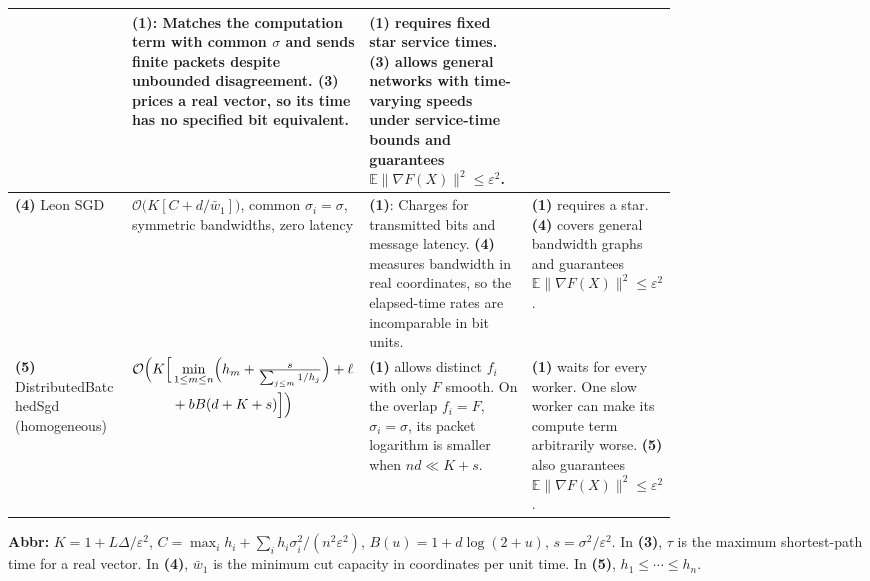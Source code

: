 \begin{table}[tp]
\begin{threeparttable}
\begin{tabularx}{\linewidth}{@{}>{\raggedright\arraybackslash}p{0.20\linewidth}>{\raggedright\arraybackslash}p{0.32\linewidth}>{\raggedright\arraybackslash}p{0.25\linewidth}>{\raggedright\arraybackslash}X@{}}
& \textbf{(1)}: Matches the computation term with common $\sigma$ and sends finite packets despite unbounded disagreement. \textbf{(3)} prices a real vector, so its time has no specified bit equivalent.
& \textbf{(1)} requires fixed star service times. \textbf{(3)} allows general networks with time-varying speeds under service-time bounds and guarantees $\mathbb E\|\nabla F(X)\|^2\le\varepsilon^2$. \\
\midrule
\textbf{(4)} Leon SGD \citep[Thm.~1.7]{dasnLeon2026}
& $\mathcal{O}\bigl(K[C+d/\bar w_1]\bigr)$, common $\sigma_i=\sigma$, symmetric bandwidths, zero latency
& \textbf{(1)}: Charges for transmitted bits and message latency. \textbf{(4)} measures bandwidth in real coordinates, so the elapsed-time rates are incomparable in bit units.
& \textbf{(1)} requires a star. \textbf{(4)} covers general bandwidth graphs and guarantees $\mathbb E\|\nabla F(X)\|^2\le\varepsilon^2$. \\
\midrule
\textbf{(5)} Distributed\allowbreak Batched\allowbreak Sgd \citep{dhlnBatchedRepository} (homogeneous)
& $\begin{aligned}
\mathcal{O}\Bigl(K\Bigl[&\min_{1\le m\le n}\Bigl(h_m+
 \tfrac{s}{\sum_{j\le m}1/h_j}\Bigr)+\ell\\
 &{}+bB(d+K+s)\Bigr]\Bigr)
\end{aligned}$
& \textbf{(1)} allows distinct $f_i$ with only $F$ smooth. On the overlap $f_i=F$, $\sigma_i=\sigma$, its packet logarithm is smaller when $nd\ll K+s$.
& \textbf{(1)} waits for every worker. One slow worker can make its compute term arbitrarily worse. \textbf{(5)} also guarantees $\mathbb E\|\nabla F(X)\|^2\le\varepsilon^2$. \\
\bottomrule
\end{tabularx}
\begin{tablenotes}[flushleft]\footnotesize
\item[] \textbf{Abbr:} $K=1+L\Delta/\varepsilon^2$, $C=\max_i h_i+\sum_i h_i\sigma_i^2/(n^2\varepsilon^2)$, $B(u)=1+d\log(2+u)$, $s=\sigma^2/\varepsilon^2$. In \textbf{(3)}, $\tau$ is the maximum shortest-path time for a real vector. In \textbf{(4)}, $\bar w_1$ is the minimum cut capacity in coordinates per unit time. In \textbf{(5)}, $h_1\le\cdots\le h_n$.
\end{tablenotes}
\end{threeparttable}
\end{table}
